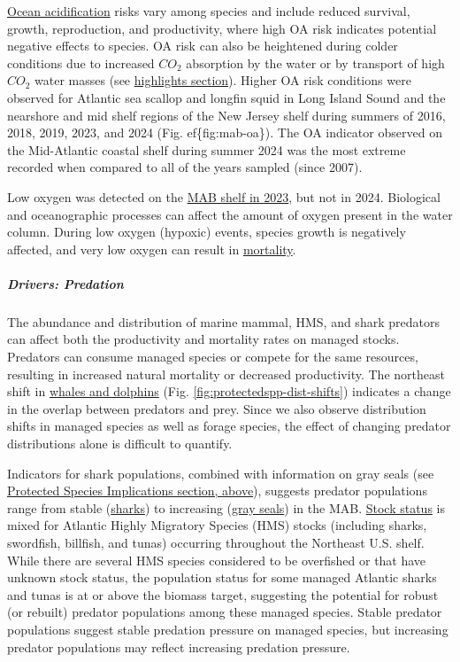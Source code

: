 \documentclass[
  10pt,
]{article}
\begin{document}
\href{https://noaa-edab.github.io/catalog/ocean_acidification.html}{Ocean acidification} risks vary among species and include reduced survival, growth, reproduction, and productivity, where high OA risk indicates potential negative effects to species. OA risk can also be heightened during colder conditions due to increased \(CO_2\) absorption by the water or by transport of high \(CO_2\) water masses (see \hyperref[highlights]{highlights section}). Higher OA risk conditions were observed for Atlantic sea scallop and longfin squid in Long Island Sound and the nearshore and mid shelf regions of the New Jersey shelf during summers of 2016, 2018, 2019, 2023, and 2024 (Fig. ef\{fig:mab-oa\}). The OA indicator observed on the Mid-Atlantic coastal shelf during summer 2024 was the most extreme recorded when compared to all of the years sampled (since 2007).

Low oxygen was detected on the \href{https://noaa-edab.github.io/catalog/observation_synthesis_2023.html}{MAB shelf in 2023}, but not in 2024. Biological and oceanographic processes can affect the amount of oxygen present in the water column. During low oxygen (hypoxic) events, species growth is negatively affected, and very low oxygen can result in \href{https://sebsnjaesnews.rutgers.edu/2023/12/rutgers-scientists-observe-unusual-ocean-conditions-possibly-linked-to-mortality-in-marine-life-off-new-jersey/}{mortality}.

\subparagraph{Drivers: Predation}\label{drivers-predation}

The abundance and distribution of marine mammal, HMS, and shark predators can affect both the productivity and mortality rates on managed stocks. Predators can consume managed species or compete for the same resources, resulting in increased natural mortality or decreased productivity. The northeast shift in \href{https://noaa-edab.github.io/catalog/cetacean_dist.html}{whales and dolphins} (Fig. \ref{fig:protectedspp-dist-shifts}) indicates a change in the overlap between predators and prey. Since we also observe distribution shifts in managed species as well as forage species, the effect of changing predator distributions alone is difficult to quantify.

Indicators for shark populations, combined with information on gray seals (see \hyperref[protected-species]{Protected Species Implications section, above}), suggests predator populations range from stable (\href{https://noaa-edab.github.io/catalog/hms_cpue.html}{sharks}) to increasing (\href{https://noaa-edab.github.io/catalog/seal_pups.html}{gray seals}) in the MAB. \href{https://noaa-edab.github.io/catalog/hms_stock_status.html}{Stock status} is mixed for Atlantic Highly Migratory Species (HMS) stocks (including sharks, swordfish, billfish, and tunas) occurring throughout the Northeast U.S. shelf. While there are several HMS species considered to be overfished or that have unknown stock status, the population status for some managed Atlantic sharks and tunas is at or above the biomass target, suggesting the potential for robust (or rebuilt) predator populations among these managed species. Stable predator populations suggest stable predation pressure on managed species, but increasing predator populations may reflect increasing predation pressure.
\end{document}
